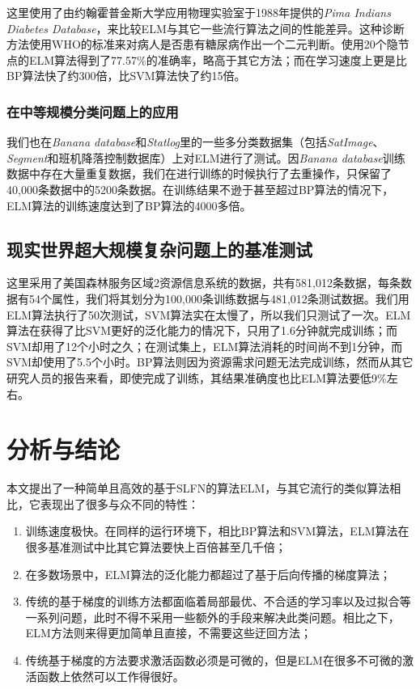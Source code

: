 \documentclass[conference]{IEEEtran}
\begin{document}
这里使用了由约翰霍普金斯大学应用物理实验室于1988年提供的\textit{Pima Indians Diabetes Database}，来比较ELM与其它一些流行算法之间的性能差异。这种诊断方法使用WHO的标准来对病人是否患有糖尿病作出一个二元判断。使用20个隐节点的ELM算法得到了77.57\%的准确率，略高于其它方法；而在学习速度上更是比BP算法快了约300倍，比SVM算法快了约15倍。

\subsubsection{在中等规模分类问题上的应用}

我们也在\textit{Banana database}和\textit{Statlog}里的一些多分类数据集（包括\textit{SatImage}、\textit{Segment}和班机降落控制数据库）上对ELM进行了测试。因\textit{Banana database}训练数据中存在大量重复数据，我们在进行训练的时候执行了去重操作，只保留了40,000条数据中的5200条数据。在训练结果不逊于甚至超过BP算法的情况下，ELM算法的训练速度达到了BP算法的4000多倍。

\subsection{现实世界超大规模复杂问题上的基准测试}

这里采用了美国森林服务区域2资源信息系统的数据，共有581,012条数据，每条数据有54个属性，我们将其划分为100,000条训练数据与481,012条测试数据。我们用ELM算法执行了50次测试，SVM算法实在太慢了，所以我们只测试了一次。ELM算法在获得了比SVM更好的泛化能力的情况下，只用了1.6分钟就完成训练；而SVM却用了12个小时之久；在测试集上，ELM算法消耗的时间尚不到1分钟，而SVM却使用了5.5个小时。BP算法则因为资源需求问题无法完成训练，然而从其它研究人员的报告来看，即使完成了训练，其结果准确度也比ELM算法要低9\%左右。

\section{分析与结论}

本文提出了一种简单且高效的基于SLFN的算法ELM，与其它流行的类似算法相比，它表现出了很多与众不同的特性：
\begin{enumerate}
	\item 训练速度极快。在同样的运行环境下，相比BP算法和SVM算法，ELM算法在很多基准测试中比其它算法要快上百倍甚至几千倍；
	\item 在多数场景中，ELM算法的泛化能力都超过了基于后向传播的梯度算法；
	\item 传统的基于梯度的训练方法都面临着局部最优、不合适的学习率以及过拟合等一系列问题，此时不得不采用一些额外的手段来解决此类问题。相比之下，ELM方法则来得更加简单且直接，不需要这些迂回方法；
	\item 传统基于梯度的方法要求激活函数必须是可微的，但是ELM在很多不可微的激活函数上依然可以工作得很好。
\end{enumerate}
\end{document}
